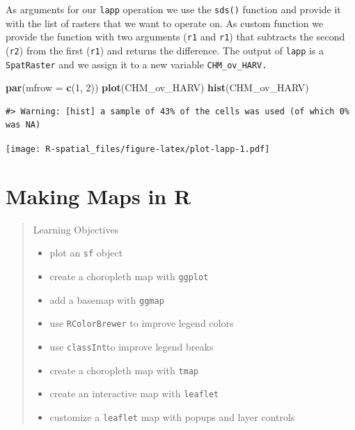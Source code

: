 \documentclass[
]{book}
\newenvironment{Shaded}{\begin{snugshade}}{\end{snugshade}}
\newcommand{\AttributeTok}[1]{\textcolor[rgb]{0.13,0.29,0.53}{#1}}
\newcommand{\DecValTok}[1]{\textcolor[rgb]{0.00,0.00,0.81}{#1}}
\newcommand{\FunctionTok}[1]{\textcolor[rgb]{0.13,0.29,0.53}{\textbf{#1}}}
\newcommand{\NormalTok}[1]{#1}
\providecommand{\tightlist}{%
  \setlength{\itemsep}{0pt}\setlength{\parskip}{0pt}}
\begin{document}
As arguments for our \texttt{lapp} operation we use the \texttt{sds()} function and provide it with the list of rasters that we want to operate on. As custom function we provide the function with two arguments (\texttt{r1} and \texttt{r1}) that subtracts the second (\texttt{r2}) from the first (\texttt{r1}) and returns the difference. The output of \texttt{lapp} is a \texttt{SpatRaster} and we assign it to a new variable \texttt{CHM\_ov\_HARV.}

\begin{Shaded}
\begin{Highlighting}[]
\FunctionTok{par}\NormalTok{(}\AttributeTok{mfrow =} \FunctionTok{c}\NormalTok{(}\DecValTok{1}\NormalTok{, }\DecValTok{2}\NormalTok{))}
\FunctionTok{plot}\NormalTok{(CHM\_ov\_HARV)}
\FunctionTok{hist}\NormalTok{(CHM\_ov\_HARV)}
\end{Highlighting}
\end{Shaded}

\begin{verbatim}
#> Warning: [hist] a sample of 43% of the cells was used (of which 0% was NA)
\end{verbatim}

\texttt{[image: R-spatial\_files/figure-latex/plot-lapp-1.pdf]}

\hypertarget{mapping}{%
\chapter{Making Maps in R}\label{mapping}}

\begin{quote}
Learning Objectives

\begin{itemize}
\tightlist
\item
  plot an \texttt{sf} object
\item
  create a choropleth map with \texttt{ggplot}
\item
  add a basemap with \texttt{ggmap}
\item
  use \texttt{RColorBrewer} to improve legend colors
\item
  use \texttt{classInt}to improve legend breaks
\item
  create a choropleth map with \texttt{tmap}
\item
  create an interactive map with \texttt{leaflet}
\item
  customize a \texttt{leaflet} map with popups and layer controls
\end{itemize}
\end{quote}
\end{document}
